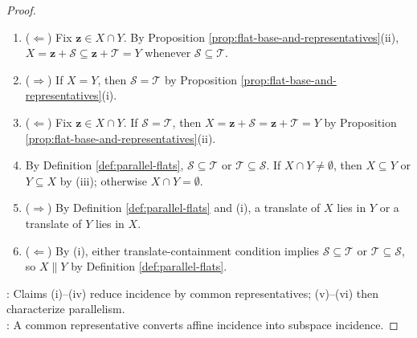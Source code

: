 \begin{proposition}
\begin{proof}
\begin{enumerate}[label=(\roman*)]
\item[$(iii)$] ($\Leftarrow$) Fix $\mathbf{z}\in X\cap Y$. By Proposition \ref{prop:flat-base-and-representatives}(ii), $X=\mathbf{z}+\mathcal{S}\subseteq\mathbf{z}+\mathcal{T}=Y$ whenever $\mathcal{S}\subseteq\mathcal{T}$.
\item[$(iv)$] ($\Rightarrow$) If $X=Y$, then $\mathcal{S}=\mathcal{T}$ by Proposition \ref{prop:flat-base-and-representatives}(i).
\item[$(iv)$] ($\Leftarrow$) Fix $\mathbf{z}\in X\cap Y$. If $\mathcal{S}=\mathcal{T}$, then $X=\mathbf{z}+\mathcal{S}=\mathbf{z}+\mathcal{T}=Y$ by Proposition \ref{prop:flat-base-and-representatives}(ii).
\item[$(v)$] By Definition \ref{def:parallel-flats}, $\mathcal{S}\subseteq\mathcal{T}$ or $\mathcal{T}\subseteq\mathcal{S}$. If $X\cap Y\neq\emptyset$, then $X\subseteq Y$ or $Y\subseteq X$ by (iii); otherwise $X\cap Y=\emptyset$.
\item[$(vi)$] ($\Rightarrow$) By Definition \ref{def:parallel-flats} and (i), a translate of $X$ lies in $Y$ or a translate of $Y$ lies in $X$.
\item[$(vi)$] ($\Leftarrow$) By (i), either translate-containment condition implies $\mathcal{S}\subseteq\mathcal{T}$ or $\mathcal{T}\subseteq\mathcal{S}$, so $X\parallel Y$ by Definition \ref{def:parallel-flats}.
\end{enumerate}
: Claims (i)--(iv) reduce incidence by common representatives; (v)--(vi) then characterize parallelism.\\
: A common representative converts affine incidence into subspace incidence.
\end{proof}
\end{proposition}

